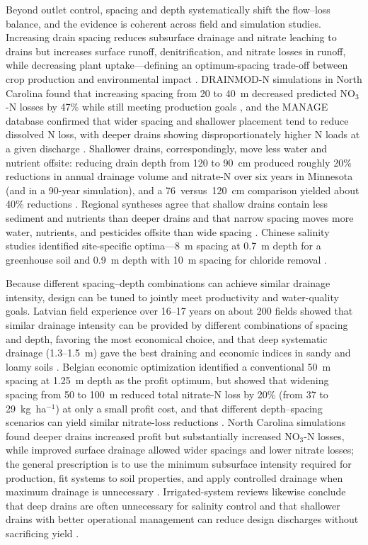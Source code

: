 Beyond outlet control, spacing and depth systematically shift the flow--loss
balance, and the evidence is coherent across field and simulation studies.
Increasing drain spacing reduces subsurface drainage and nitrate leaching to
drains but increases surface runoff, denitrification, and nitrate losses in
runoff, while decreasing plant uptake---defining an optimum-spacing trade-off
between crop production and environmental impact \parencite{ElSadek2002,ElSadek2002b}.
DRAINMOD-N simulations in North Carolina found that increasing spacing from 20
to 40~m decreased predicted NO$_3$-N losses by 47\% while still meeting
production goals \parencite{Skaggs1995}, and the MANAGE database confirmed that
wider spacing and shallower placement tend to reduce dissolved N loss, with
deeper drains showing disproportionately higher N loads at a given discharge
\parencite{Christianson2015}. Shallower drains, correspondingly, move less water
and nutrient offsite: reducing drain depth from 120 to 90~cm produced roughly
20\% reductions in annual drainage volume and nitrate-N over six years in
Minnesota (and in a 90-year simulation), and a 76~versus~120~cm comparison
yielded about 40\% reductions \parencite{Strock2011}. Regional syntheses agree
that shallow drains contain less sediment and nutrients than deeper drains and
that narrow spacing moves more water, nutrients, and pesticides offsite than
wide spacing \parencite{FAUSEY1995}. Chinese salinity studies identified
site-specific optima---8~m spacing at 0.7~m depth for a greenhouse soil
\parencite{Shao2012} and 0.9~m depth with 10~m spacing for chloride removal
\parencite{Yan2013b}.

Because different spacing--depth combinations can achieve similar drainage
intensity, design can be tuned to jointly meet productivity and water-quality
goals. Latvian field experience over 16--17 years on about 200 fields showed
that similar drainage intensity can be provided by different combinations of
spacing and depth, favoring the most economical choice, and that deep systematic
drainage (1.3--1.5~m) gave the best draining and economic indices in sandy and
loamy soils \parencite{SHKINKIS1979}. Belgian economic optimization identified a
conventional 50~m spacing at 1.25~m depth as the profit optimum, but showed that
widening spacing from 50 to 100~m reduced total nitrate-N loss by 20\% (from 37
to 29~kg~ha$^{-1}$) at only a small profit cost, and that different
depth--spacing scenarios can yield similar nitrate-loss reductions
\parencite{ElSadek2002b}. North Carolina simulations found deeper drains
increased profit but substantially increased NO$_3$-N losses, while improved
surface drainage allowed wider spacings and lower nitrate losses; the general
prescription is to use the minimum subsurface intensity required for production,
fit systems to soil properties, and apply controlled drainage when maximum
drainage is unnecessary \parencite{Breve1998}. Irrigated-system reviews likewise
conclude that deep drains are often unnecessary for salinity control and that
shallower drains with better operational management can reduce design discharges
without sacrificing yield \parencite{Ritzema2011}.

